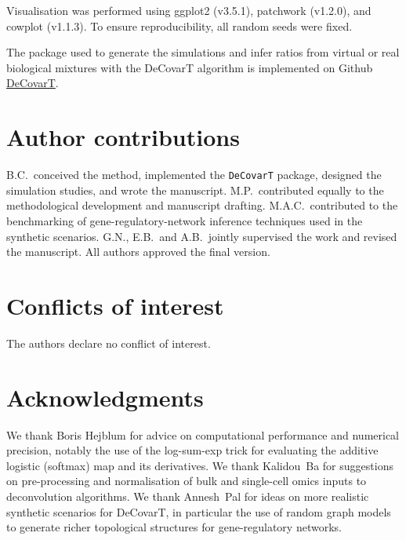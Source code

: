 \documentclass[pdflatex, sn-nature]{sn-jnl}
\theoremstyle{thmstyleone}%
\theoremstyle{thmstyletwo}%
\theoremstyle{thmstylethree}%
\begin{document}
    Visualisation was performed using ggplot2 (v3.5.1), patchwork (v1.2.0), and cowplot
    (v1.1.3). To ensure reproducibility, all random seeds were fixed.

    The package used to generate the simulations and infer ratios from virtual or
    real biological mixtures with the DeCovarT algorithm is implemented on Github
    \href{https://github.com/bastienchassagnol/DeCovarT}{DeCovarT}.

    \section{Author contributions}

    B.C.\ conceived the method, implemented the \texttt{DeCovarT} package,
    designed the simulation studies, and wrote the manuscript. M.P.\ contributed
    equally to the methodological development and manuscript drafting.
    M.A.C.\ contributed to the benchmarking of gene-regulatory-network inference
    techniques used in the synthetic scenarios. G.N., E.B.\ and A.B.\ jointly
    supervised the work and revised the manuscript. All authors approved the
    final version.

    \section{Conflicts of interest}

    The authors declare no conflict of interest.

    \section{Acknowledgments}

    We thank Boris Hejblum for advice on computational performance and numerical
    precision, notably the use of the log-sum-exp trick for evaluating the
    additive logistic (softmax) map and its derivatives. We thank Kalidou~Ba for
    suggestions on pre-processing and normalisation of bulk and single-cell omics
    inputs to deconvolution algorithms. We thank Annesh~Pal for ideas on more
    realistic synthetic scenarios for DeCovarT, in particular the use of random
    graph models to generate richer topological structures for gene-regulatory
    networks.

    \backmatter
\end{document}
